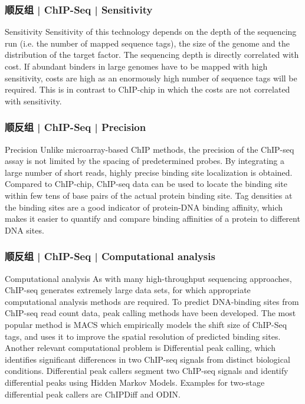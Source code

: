 \begin{frame}
  \frametitle{顺反组 | ChIP-Seq | Sensitivity}
  \begin{block}{Sensitivity}
    Sensitivity of this technology depends on the depth of the sequencing run (i.e. the number of mapped sequence tags), the size of the genome and the distribution of the target factor. The sequencing depth is directly correlated with cost. If abundant binders in large genomes have to be mapped with high sensitivity, costs are high as an enormously high number of sequence tags will be required. This is in contrast to ChIP-chip in which the costs are not correlated with sensitivity.
  \end{block}
\end{frame}

\begin{frame}
  \frametitle{顺反组 | ChIP-Seq | Precision}
  \begin{block}{Precision}
    Unlike microarray-based ChIP methods, the precision of the ChIP-seq assay is not limited by the spacing of predetermined probes. By integrating a large number of short reads, highly precise binding site localization is obtained. Compared to ChIP-chip, ChIP-seq data can be used to locate the binding site within few tens of base pairs of the actual protein binding site. Tag densities at the binding sites are a good indicator of protein-DNA binding affinity, which makes it easier to quantify and compare binding affinities of a protein to different DNA sites.
  \end{block}
\end{frame}

\begin{frame}
  \frametitle{顺反组 | ChIP-Seq | Computational analysis}
  \begin{block}{Computational analysis}
    As with many high-throughput sequencing approaches, ChIP-seq generates extremely large data sets, for which appropriate computational analysis methods are required. To predict DNA-binding sites from ChIP-seq read count data, peak calling methods have been developed. The most popular method is MACS which empirically models the shift size of ChIP-Seq tags, and uses it to improve the spatial resolution of predicted binding sites.\\
    \vspace{1em}
    Another relevant computational problem is Differential peak calling, which identifies significant differences in two ChIP-seq signals from distinct biological conditions. Differential peak callers segment two ChIP-seq signals and identify differential peaks using Hidden Markov Models. Examples for two-stage differential peak callers are ChIPDiff and ODIN.
  \end{block}
\end{frame}

